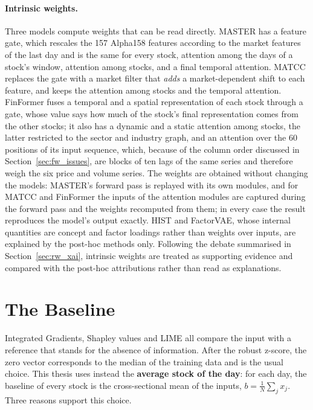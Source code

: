 \paragraph{Intrinsic weights.} Three models compute weights that can be read directly. MASTER has a feature gate, which rescales the 157 Alpha158 features according to the market features of the last day and is the same for every stock, attention among the days of a stock's window, attention among stocks, and a final temporal attention. MATCC replaces the gate with a market filter that \emph{adds} a market-dependent shift to each feature, and keeps the attention among stocks and the temporal attention. FinFormer fuses a temporal and a spatial representation of each stock through a gate, whose value says how much of the stock's final representation comes from the other stocks; it also has a dynamic and a static attention among stocks, the latter restricted to the sector and industry graph, and an attention over the 60 positions of its input sequence, which, because of the column order discussed in Section~\ref{sec:fw_issues}, are blocks of ten lags of the same series and therefore weigh the six price and volume series. The weights are obtained without changing the models: MASTER's forward pass is replayed with its own modules, and for MATCC and FinFormer the inputs of the attention modules are captured during the forward pass and the weights recomputed from them; in every case the result reproduces the model's output exactly. HIST and FactorVAE, whose internal quantities are concept and factor loadings rather than weights over inputs, are explained by the post-hoc methods only. Following the debate summarised in Section~\ref{sec:rw_xai}, intrinsic weights are treated as supporting evidence and compared with the post-hoc attributions rather than read as explanations.

\section{The Baseline}
\label{sec:xm_baseline}

Integrated Gradients, Shapley values and LIME all compare the input with a reference that stands for the absence of information. After the robust z-score, the zero vector corresponds to the median of the training data and is the usual choice. This thesis uses instead the \textbf{average stock of the day}: for each day, the baseline of every stock is the cross-sectional mean of the inputs, $b = \frac{1}{N} \sum_{j} x_j$. Three reasons support this choice.

